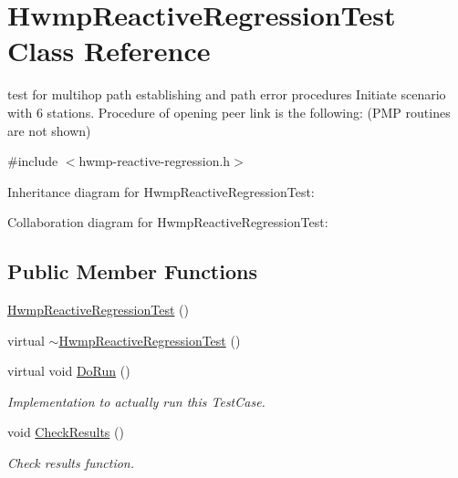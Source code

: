 \hypertarget{classHwmpReactiveRegressionTest}{}\section{Hwmp\+Reactive\+Regression\+Test Class Reference}
\label{classHwmpReactiveRegressionTest}


test for multihop path establishing and path error procedures Initiate scenario with 6 stations. Procedure of opening peer link is the following\+: (P\+MP routines are not shown)  




{\ttfamily \#include $<$hwmp-\/reactive-\/regression.\+h$>$}



Inheritance diagram for Hwmp\+Reactive\+Regression\+Test\+:


Collaboration diagram for Hwmp\+Reactive\+Regression\+Test\+:
\subsection*{Public Member Functions}
\begin{DoxyCompactItemize}
\item 
\hyperlink{classHwmpReactiveRegressionTest_a93d39fda21d21618abfe37f860fafdee}{Hwmp\+Reactive\+Regression\+Test} ()
\item 
virtual \hyperlink{classHwmpReactiveRegressionTest_aa605ef251fbc85ca4149a69c162e38b6}{$\sim$\+Hwmp\+Reactive\+Regression\+Test} ()
\item 
virtual void \hyperlink{classHwmpReactiveRegressionTest_ae66a095a74ef4e2cbdfc0d042b50e63c}{Do\+Run} ()
\begin{DoxyCompactList}\small\item\em Implementation to actually run this Test\+Case. \end{DoxyCompactList}\item 
void \hyperlink{classHwmpReactiveRegressionTest_ac569040c1302832cf8ffb128b5909007}{Check\+Results} ()
\begin{DoxyCompactList}\small\item\em Check results function. \end{DoxyCompactList}\end{DoxyCompactItemize}
